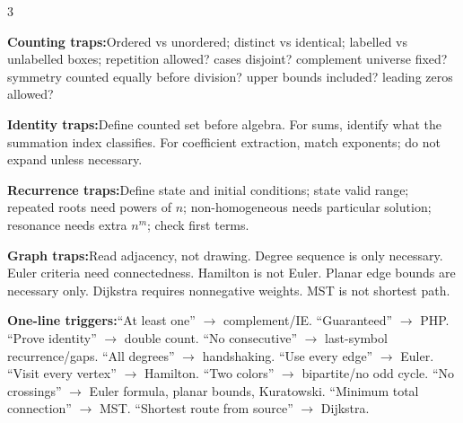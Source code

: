 \documentclass[10pt]{article}
\newenvironment{cheatitems}{\par\vspace{-1pt}}{\par\vspace{-1pt}}
\newcommand{\cheatrow}[2]{\par\noindent\textbf{#1:}\enspace #2\par}
\begin{document}
\begin{multicols}{3}
\begin{cheatitems}
\cheatrow{Counting traps}{Ordered vs unordered; distinct vs identical; labelled vs unlabelled boxes; repetition allowed? cases disjoint? complement universe fixed? symmetry counted equally before division? upper bounds included? leading zeros allowed?}
\cheatrow{Identity traps}{Define counted set before algebra. For sums, identify what the summation index classifies. For coefficient extraction, match exponents; do not expand unless necessary.}
\cheatrow{Recurrence traps}{Define state and initial conditions; state valid range; repeated roots need powers of $n$; non-homogeneous needs particular solution; resonance needs extra $n^m$; check first terms.}
\cheatrow{Graph traps}{Read adjacency, not drawing. Degree sequence is only necessary. Euler criteria need connectedness. Hamilton is not Euler. Planar edge bounds are necessary only. Dijkstra requires nonnegative weights. MST is not shortest path.}
\cheatrow{One-line triggers}{``At least one'' $\to$ complement/IE. ``Guaranteed'' $\to$ PHP. ``Prove identity'' $\to$ double count. ``No consecutive'' $\to$ last-symbol recurrence/gaps. ``All degrees'' $\to$ handshaking. ``Use every edge'' $\to$ Euler. ``Visit every vertex'' $\to$ Hamilton. ``Two colors'' $\to$ bipartite/no odd cycle. ``No crossings'' $\to$ Euler formula, planar bounds, Kuratowski. ``Minimum total connection'' $\to$ MST. ``Shortest route from source'' $\to$ Dijkstra.}
\end{cheatitems}

\end{multicols}
\end{document}

